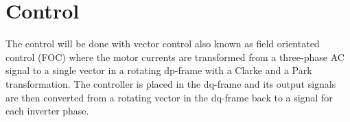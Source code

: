 \section{Control}
\label{sec:control}

The control will be done with vector control also known as field orientated control (FOC) where the motor currents are transformed from a three-phase AC signal to a single vector in a rotating dp-frame with a Clarke and a Park transformation. The controller is placed in the dq-frame and its output signals are then converted from a rotating vector in the dq-frame back to a signal for each inverter phase.







